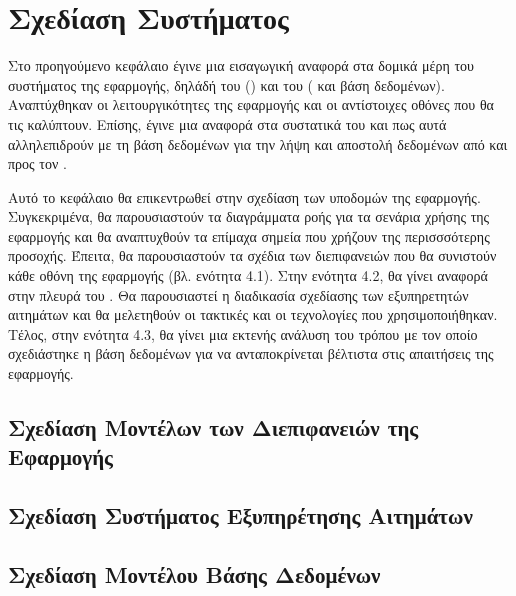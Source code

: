 \chapter{Σχεδίαση Συστήματος}
\label{chap4}

Στο προηγούμενο κεφάλαιο έγινε μια εισαγωγική αναφορά στα δομικά μέρη του συστήματος της εφαρμογής, δηλάδή του  () και του  ( και βάση δεδομένων). Αναπτύχθηκαν οι λειτουργικότητες της εφαρμογής και οι αντίστοιχες οθόνες που θα τις καλύπτουν. Επίσης, έγινε μια αναφορά στα συστατικά του  και πως αυτά αλληλεπιδρούν με τη βάση δεδομένων για την λήψη και αποστολή δεδομένων από και προς τον .

Αυτό το κεφάλαιο θα επικεντρωθεί στην σχεδίαση των υποδομών της εφαρμογής. Συγκεκριμένα, θα παρουσιαστούν τα διαγράμματα ροής για τα σενάρια χρήσης της εφαρμογής και θα αναπτυχθούν τα επίμαχα σημεία που χρήζουν της περισσσότερης προσοχής. Έπειτα, θα παρουσιαστούν τα σχέδια των διεπιφανειών που θα συνιστούν κάθε οθόνη της εφαρμογής (βλ. ενότητα 4.1). Στην ενότητα 4.2, θα γίνει αναφορά στην πλευρά του . Θα παρουσιαστεί η διαδικασία σχεδίασης των εξυπηρετητών αιτημάτων και θα μελετηθούν οι τακτικές και οι τεχνολογίες που χρησιμοποιήθηκαν. Τέλος, στην ενότητα 4.3, θα γίνει μια εκτενής ανάλυση του τρόπου με τον οποίο σχεδιάστηκε η βάση δεδομένων για να ανταποκρίνεται βέλτιστα στις απαιτήσεις της εφαρμογής.


\section{Σχεδίαση Μοντέλων των Διεπιφανειών της Εφαρμογής}




\section{Σχεδίαση Συστήματος Εξυπηρέτησης Αιτημάτων}



\section{Σχεδίαση Μοντέλου Βάσης Δεδομένων}



